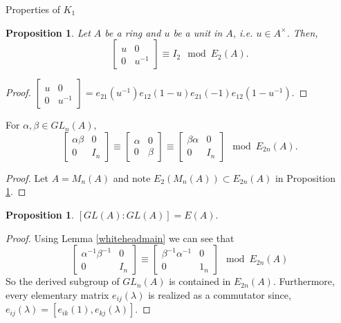 \documentclass{beamer}
\newcounter{dummy} \numberwithin{dummy}{section}
\newtheorem{proposition}[dummy]{Proposition}
\begin{document}
\begin{frame}[allowframebreaks]{Properties of $K_1$}
	\begin{proposition}\label{whiteheadsimple}
		Let $A$ be a ring and $u$ be a unit in $A$, i.e. $u \in A^\times$. Then,
		\[ {\displaystyle {\begin{bmatrix}u&0\\0&u^{-1}\end{bmatrix}}} \equiv I_2 \mod E_2(A).\]
	\end{proposition}
	\begin{proof}
		${\displaystyle {\begin{bmatrix}u&0\\0&u^{-1}\end{bmatrix}}=e_{21}(u^{-1})e_{12}(1-u)e_{21}(-1)e_{12}(1-u^{-1}).}$
	\end{proof}
	\newpage
	\begin{lemma}[Whitehead]\label{whiteheadmain}
		For $\alpha,\beta \in GL_n(A),$ \[ \begin{bmatrix}
			\alpha \beta & 0 \\ 0 & I_n
		\end{bmatrix} \equiv \begin{bmatrix} \alpha & 0 \\ 0 & \beta
		\end{bmatrix} \equiv \begin{bmatrix}
			\beta \alpha  & 0 \\ 0 & I_n 
		\end{bmatrix} \mod E_{2n} (A).\]
	\end{lemma}
	\begin{proof}
		Let $A=M_n(A)$ and note $E_2(M_n(A) ) \subset E_{2n}(A)$ in Proposition \ref{whiteheadsimple}.
	\end{proof}
	\newpage
	\begin{proposition}
		\( [GL(A):GL(A)]=E(A) .\)
	\end{proposition}
	\begin{proof}
		Using Lemma \ref{whiteheadmain} we can see that \[ \begin{bmatrix}
			\alpha^{-1}\beta^{-1} & 0 \\ 0 & I_n
		\end{bmatrix} \equiv \begin{bmatrix}
			\beta^{-1} \alpha^{-1 } & 0 \\
			0 & 1_n
		\end{bmatrix} \mod E_{2n}(A)\]
		So the derived subgroup of $GL_n(A)$ is contained in $E_{2n}(A)$. Furthermore, every elementary matrix $e_{ij}(\lambda)$ is realized as a commutator since, $e_{ij}(\lambda)=[e_{ik}(1 ), e_{kj} (\lambda)]$.
	\end{proof}	
\end{frame}
\end{document}
